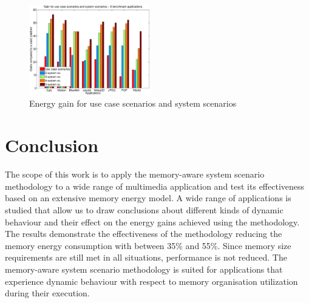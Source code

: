 \documentclass[a4paper,conference]{IEEEtran}
\begin{document}
\begin{figure}[!t]
\centering
\includegraphics[width=0.47\textwidth]{Images/usecase.eps}
\caption{Energy gain for use case scenarios and system scenarios}
\label{fig:usecase}
\end{figure}

\section{Conclusion}
\label{sec:conclusion}

The scope of this work is to apply the memory-aware system scenario methodology to a wide range of multimedia application and test its effectiveness based on an extensive memory energy model. A wide range of applications is studied that allow us to draw conclusions about different kinds of dynamic behaviour and their effect on the energy gains achieved using the methodology. The results demonstrate the effectiveness of the methodology reducing the memory energy consumption with between 35\% and 55\%. Since memory size requirements are still met in all situations, performance is not reduced. The memory-aware system scenario methodology is suited for applications that experience dynamic behaviour with respect to memory organisation utilization during their execution.



\end{document}
